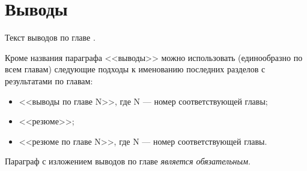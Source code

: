 \section{Выводы} \label{ch1:conclusion}

Текст выводов по главе \thechapter.

Кроме названия параграфа <<выводы>> можно использовать (единообразно по всем главам) следующие подходы к именованию последних разделов с результатами по главам:
\begin{itemize}
	\item <<выводы по главе N>>, где N --- номер соответствующей главы;
	\item <<резюме>>;
	\item <<резюме по главе N>>, где N --- номер соответствующей главы.
\end{itemize}

Параграф с изложением выводов по главе \textit{является обязательным}.

%
